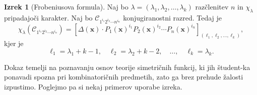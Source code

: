 \documentclass[11pt]{book}
\def\conclass{\mathcal{C}}
\theoremstyle{definition}
\theoremstyle{zgled}
\theoremstyle{odprtproblem}
\theoremstyle{domacanaloga}
\theoremstyle{izrek}
\newtheorem*{izrek}{Izrek}
\begin{document}
\begin{izrek}[Frobeniusova formula]
Naj bo $\lambda = (\lambda_1, \lambda_2, \dots, \lambda_k)$ razčlenitev $n$ in $\chi_{\lambda}$ pripadajoči karakter. Naj bo $\conclass_{1^{i_1} 2^{i_2} \cdots n^{i_n}}$ konjugiranostni razred. Tedaj je 
\[
    \chi_{\lambda}\left(\conclass_{1^{i_1} 2^{i_2} \cdots n^{i_n}}\right) =
    \left[ \Delta(\mathbf{x}) \cdot P_1(\mathbf{x})^{i_1} P_2(\mathbf{x})^{i_2} \cdots P_n(\mathbf{x})^{i_n} \right]_{(\ell_1, \ell_2, \dots, \ell_k)},
\]
kjer je
\[
    \ell_1 = \lambda_1 + k - 1, \quad
    \ell_2 = \lambda_2 + k - 2, \quad
    \dots, \quad
    \ell_k = \lambda_k.
\]
\end{izrek}

Dokaz temelji na poznavanju osnov teorije simetričnih funkcij, ki jih študent-ka ponavadi spozna pri kombinatoričnih predmetih, zato ga brez prehude žalosti izpustimo. Poglejmo pa si nekaj primerov uporabe izreka.
\end{document}
